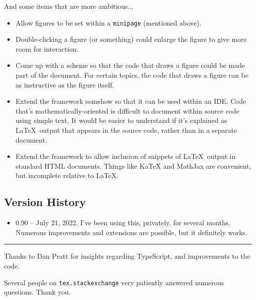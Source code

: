 \documentclass[10pt]{article}
\begin{document}
\noindent And some items that are more ambitious...
\begin{itemize}[itemsep=-1pt,leftmargin=*]
\item Allow figures to be set within a {\tt minipage} (mentioned above).
\item Double-clicking a figure (or something) could enlarge the figure
  to give more room for interaction.
\item Come up with a scheme so that the code that draws a figure could
  be made part of the document. For certain topics, the code that
  draws a figure can be as instructive as the figure itself.
\item Extend the framework somehow so that it can be used within an
  IDE. Code that's mathematically-oriented is difficult to
  document within source code using simple text. It would be easier to
  understand if it's explained as \LaTeX\ output that appears 
  in the source code, rather than in a separate document.
\item Extend the framework to allow inclusion of snippets of
  \LaTeX\ output in standard HTML documents. Things like KaTeX and
  MathJax are convenient, but incomplete relative to \LaTeX.
\end{itemize}

\newpage

\subsection*{Version History}

\begin{itemize}[itemsep = -3pt]
\item{0.90} -- July 21, 2022. I've been using this, privately, for
  several months. Numerous improvements and extensions are possible,
  but it definitely works.
\end{itemize}


\vskip 0.3cm
\hrule
\vskip 0.3cm


Thanks to Dan Pratt for insights regarding TypeScript, and
improvements to the code.

Several people on {\tt tex.stackexchange} very
patiently answered numerous questions. Thank you.
\end{document}
